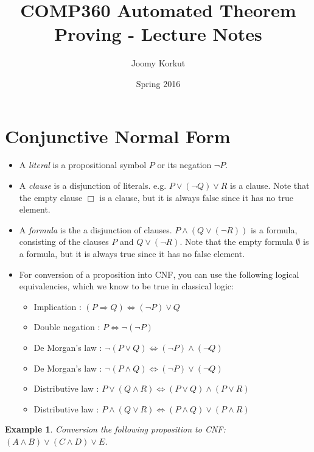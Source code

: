 \documentclass[10pt]{article}
\title{COMP360 Automated Theorem Proving - Lecture Notes}
\author{Joomy Korkut}
\date{Spring 2016}
\newtheorem{problem}{Example}
\newcommand{\imp}{\ensuremath{\Rightarrow}}
\begin{document}
\maketitle

\section{Conjunctive Normal Form}

\begin{itemize}
\item A \emph{literal} is a propositional symbol $P$ or its negation $\lnot P$.
\item A \emph{clause} is a disjunction of literals. e.g. $P \lor (\lnot Q) \lor R$ is a clause. Note that the empty clause $\Box$ is a clause, but it is always false since it has no true element.
\item A \emph{formula} is the a disjunction of clauses. $P \land (Q \lor (\lnot R))$ is a formula, consisting of the clauses $P$ and $Q \lor (\lnot R)$. Note that the empty formula $\emptyset$ is a formula, but it is always true since it has no false element.
\item For conversion of a proposition into CNF, you can use the following logical equivalencies, which we know to be true in classical logic:

    \begin{itemize}
        \item Implication : $(P \imp Q) \iff (\lnot P) \lor Q$
        \item Double negation : $P \iff \lnot(\lnot P)$
        \item De Morgan's law : $\lnot(P \lor Q) \iff (\lnot P) \land (\lnot Q)$
        \item De Morgan's law : $\lnot(P \land Q) \iff (\lnot P) \lor (\lnot Q)$
        \item Distributive law : $P \lor (Q \land R) \iff (P \lor Q) \land (P \lor R)$
        \item Distributive law : $P \land (Q \lor R) \iff (P \land Q) \lor (P \land R)$
    \end{itemize}
\end{itemize}
\begin{problem}
Conversion the following proposition to CNF: $(A \land B) \lor (C \land D) \lor E$.
\end{problem}
\end{document}
